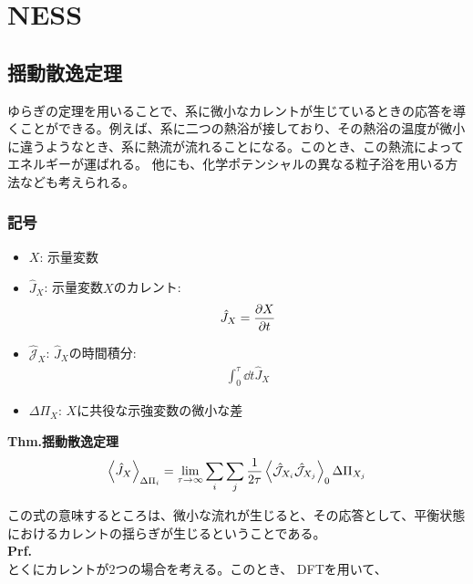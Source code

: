 \documentclass[a4paper,11pt]{jsarticle}
\numberwithin{equation}{section}
\begin{document}
\section{NESS}
\subsection{揺動散逸定理}
ゆらぎの定理を用いることで、系に微小なカレントが生じているときの応答を導くことができる。例えば、系に二つの熱浴が接しており、その熱浴の温度が微小に違うようなとき、系に熱流が流れることになる。このとき、この熱流によってエネルギーが運ばれる。
他にも、化学ポテンシャルの異なる粒子浴を用いる方法なども考えられる。\\
\subsubsection{記号}
\begin{itemize}
  \item $X$: 示量変数
  \item $\hat{J}_X$: 示量変数$X$のカレント:
  \begin{align}
    \hat{J}_X = \pdv{X}{t}
  \end{align}
  \item $\hat{\mathcal{J}}_X$: $\hat{J}_X$の時間積分:
  \begin{align}
    \int_{0}^{\tau}\dd{t}\hat{J}_X
  \end{align}
  \item $\Delta \Pi_X$: $X$に共役な示強変数の微小な差
\end{itemize}
\begin{itembox}[l]{\textbf{Thm.揺動散逸定理}}
  \begin{align}
    \ev{\hat{J}_X }_{\Delta \Pi_i} = \lim_{\tau \to \infty}\sum_{i} \sum_{j} \frac{1}{2\tau}\ev{\hat{\mathcal{J}}_{X_{i}} \hat{\mathcal{J}}_{X_{j}}}_{0} \Delta \Pi_{X_j}
  \end{align}
\end{itembox}
この式の意味するところは、微小な流れが生じると、その応答として、平衡状態におけるカレントの揺らぎが生じるということである。\\
\textbf{Prf.}\\
とくにカレントが2つの場合を考える。このとき、  DFTを用いて、
\end{document}
